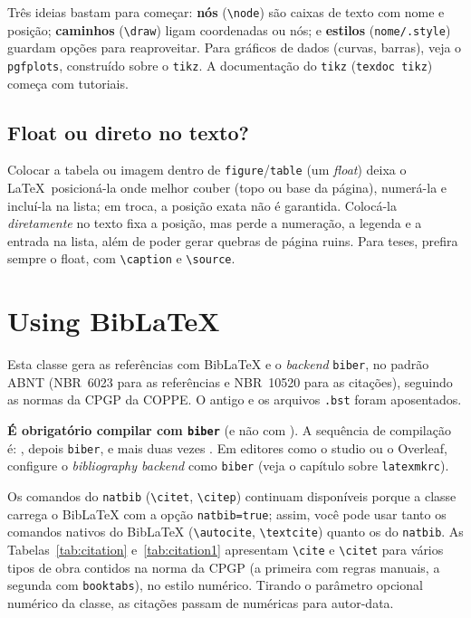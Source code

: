 \documentclass[dsc,pdfa,setavermelha]{ufrj}
\theoremstyle{plain}
\theoremstyle{definition}
\theoremstyle{remark}
\begin{document}
Três ideias bastam para começar: \textbf{nós} (\verb|\node|) são caixas de texto com nome e posição; \textbf{caminhos} (\verb|\draw|) ligam coordenadas ou nós; e \textbf{estilos} (\verb|nome/.style|) guardam opções para reaproveitar. Para gráficos de dados (curvas, barras), veja o \verb|pgfplots|, construído sobre o \verb|tikz|. A documentação do \verb|tikz| (\texttt{texdoc tikz}) começa com tutoriais.

\section{Float ou direto no texto?}

Colocar a tabela ou imagem dentro de \verb|figure|/\verb|table| (um \emph{float}) deixa o \LaTeX\ posicioná-la onde melhor couber (topo ou base da página), numerá-la e incluí-la na lista; em troca, a posição exata não é garantida. Colocá-la \emph{diretamente} no texto fixa a posição, mas perde a numeração, a legenda e a entrada na lista, além de poder gerar quebras de página ruins. Para teses, prefira sempre o float, com \verb|\caption| e \verb|\source|.

  \chapter{Using BibLaTeX}
  \label{cap:biblatex}

  Esta classe gera as referências com BibLaTeX e o \emph{backend} \texttt{biber}, no padrão ABNT (NBR~6023 para as referências e NBR~10520 para as citações), seguindo as normas da CPGP da COPPE. O antigo  e os arquivos \texttt{.bst} foram aposentados.

  \textbf{É obrigatório compilar com \texttt{biber}} (e não com ). A sequência de compilação é: , depois \texttt{biber}, e mais duas vezes . Em editores como o studio ou o Overleaf, configure o \emph{bibliography backend} como \texttt{biber} (veja o capítulo sobre \texttt{latexmkrc}).

  Os comandos do \texttt{natbib} (\verb|\citet|, \verb|\citep|) continuam disponíveis porque a classe carrega o BibLaTeX com a opção \texttt{natbib=true}; assim, você pode usar tanto os comandos nativos do BibLaTeX (\verb|\autocite|, \verb|\textcite|) quanto os do \texttt{natbib}. As Tabelas~\ref{tab:citation} e~\ref{tab:citation1} apresentam \verb|\cite| e \verb|\citet| para vários tipos de obra contidos na norma da CPGP (a primeira com regras manuais, a segunda com \texttt{booktabs}), no estilo numérico. Tirando o parâmetro opcional numérico da classe, as citações passam de numéricas para autor-data.
\end{document}
